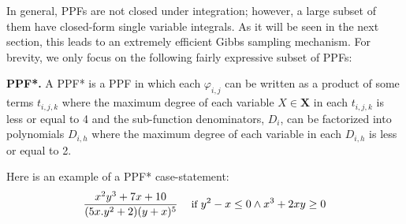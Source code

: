 \documentclass[]{article}
\renewcommand{\vec}[1]{\mathbf{#1}}
\newcommand{\bvec}[1]{\textbf{#1}}
\newcommand{\singlecase}[2]{#2 \quad \text{ if } #1}
\begin{document}
In general, PPFs are not closed under integration; however, a large subset of them 
 have closed-form single variable integrals.
As it will be seen in the next section,
this leads to an extremely efficient Gibbs sampling mechanism.   
For brevity, we only focus on the following fairly expressive  subset of PPFs:

\textbf{PPF*. }
A PPF* is a PPF in which %
each $\varphi_{i,j}$
can be written as a product of some terms $t_{i,j,k}$ where the maximum degree of each variable $X \in \bvec{X}$ in each $t_{i,j,k}$ is less or equal to 4 %
and the sub-function denominators, $D_{i}$, can be factorized into polynomials ${D}_{i,h}$ where the maximum degree of each variable in each $D_{i,h}$ is less or equal to 2.%

Here is an example of a PPF* case-statement:
\begin{equation*}\vspace{-0.5mm}
{\footnotesize
\singlecase{y^2-x\leq 0 \wedge x^3+2xy \geq 0}{\frac{x^2 y^3 + 7x + 10}{(5x.y^2 + 2)(y + x)^5}}
}
\end{equation*}

\end{document}
